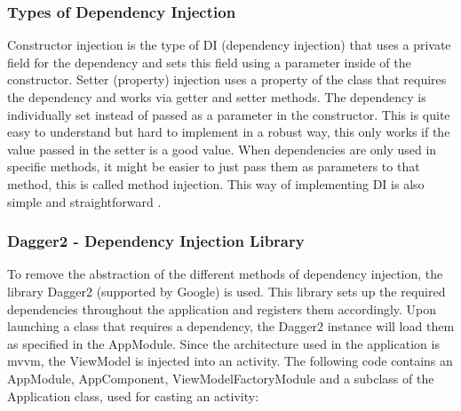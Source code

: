 \subsubsection{Types of Dependency Injection}
Constructor injection is the type of DI (dependency injection) that uses a private field for the dependency and sets this field using a parameter inside of the constructor. Setter (property) injection uses a property of the class that requires the dependency and works via getter and setter methods. The dependency is individually set instead of passed as a parameter in the constructor. This is quite easy to understand but hard to implement in a robust way, this only works if the value passed in the setter is a good value. When dependencies are only used in specific methods, it might be easier to just pass them as parameters to that method, this is called method injection. This way of implementing DI is also simple and straightforward \cite{TheoJungeblut2015}.
\subsubsection{Dagger2 - Dependency Injection Library}
To remove the abstraction of the different methods of dependency injection, the library Dagger2 (supported by Google) is used. This library sets up the required dependencies throughout the application and registers them accordingly. Upon launching a class that requires a dependency, the Dagger2 instance will load them as specified in the AppModule. Since the architecture used in the application is \acrshort{mvvm}, the ViewModel is injected into an activity. The following code contains an AppModule, AppComponent, ViewModelFactoryModule and a subclass of the Application class, used for casting an activity:

